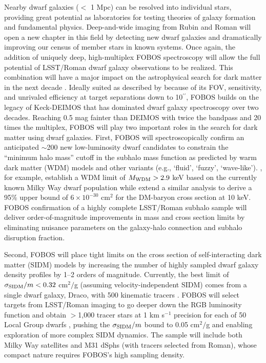 \documentclass[oneside,11pt]{amsart}
\newcommand{\arcsec}{\mbox{$^{\prime\prime}$}}
\begin{document}
Nearby dwarf galaxies ($<$ 1 Mpc) can be resolved into individual stars, providing great potential as laboratories for testing theories of galaxy formation and fundamental physics.  Deep-and-wide imaging from Rubin and Roman will open a new chapter in this field by detecting new dwarf galaxies and dramatically improving our census of member stars in known systems.  Once again, the addition of uniquely deep, high-multiplex FOBOS spectroscopy will allow the full potential of LSST/Roman dwarf galaxy observations to be realized.  This combination will have a major impact on the astrophysical search for dark matter in the next decade \citep{drlica-wagner19}.  Ideally suited as described by \citet{simon19} because of its FOV, sensitivity, and unrivaled efficiency at target separations down to 10\arcsec, FOBOS builds on the legacy of Keck-DEIMOS that has dominated dwarf galaxy spectroscopy over two decades.  Reaching 0.5 mag fainter than DEIMOS with twice the bandpass and 20 times the multiplex, FOBOS will play two important roles in the search for dark matter using dwarf galaxies.  First, FOBOS will spectroscopically confirm an anticipated $\sim$200 new low-luminosity dwarf candidates to constrain the ``minimum halo mass'' cutoff in the subhalo mass function as predicted by warm dark matter (WDM) models and other variants (e.g., `fluid', `fuzzy', `wave-like').  \citet{jethwa18}, for example, establish a WDM limit of $M_{\rm WDM} > 2.9$ keV based on the currently known Milky Way dwarf population while \citet{nadler19} extend a similar analysis to derive a 95\% upper bound of $6 \times 10^{-30}$ cm$^2$ for the DM-baryon cross section at 10 keV.  FOBOS confirmation of a highly complete LSST/Roman subhalo sample will deliver order-of-magnitude improvements in mass and cross section limits by eliminating nuisance parameters on the galaxy-halo connection and subhalo disruption fraction.

Second, FOBOS will place tight limits on the cross section of self-interacting dark matter (SIDM) models by increasing the number of highly sampled dwarf galaxy density profiles by 1--2 orders of magnitude.  Currently, the best limit of $\sigma_{\rm SIDM}/m < 0.32$ cm$^2/$g (assuming velocity-independent SIDM) comes from a single dwarf galaxy, Draco, with 500 kinematic tracers \citep{read18}.  FOBOS will select targets from LSST/Roman imaging to go deeper down the RGB luminosity function and obtain $>$1,000 tracer stars at 1 km s$^{-1}$ precision for each of 50 Local Group dwarfs \citep[see][]{drlica-wagner19}, pushing the $\sigma_{\rm SIDM}/m$ bound to 0.05 cm$^2/$g and enabling exploration of more complex SIDM dynamics.  The sample will include both Milky Way satellites and M31 dSphs (with tracers selected from Roman), whose compact nature requires FOBOS's high sampling density.   
\end{document}
